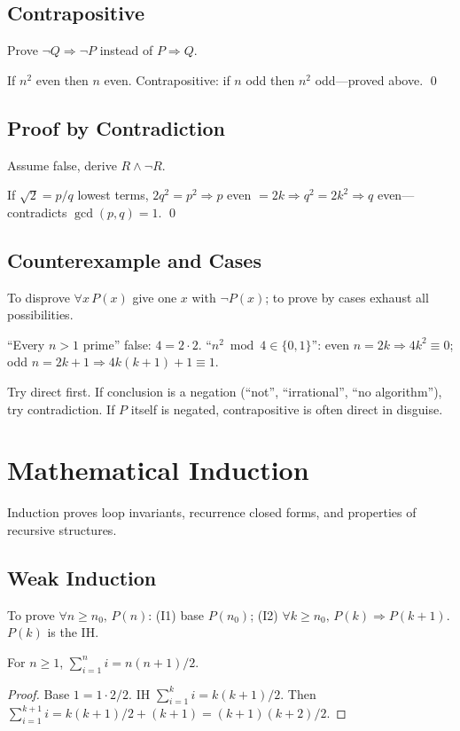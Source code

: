 \subsection{Contrapositive} Prove $\neg Q\Rightarrow\neg P$ instead of $P\Rightarrow Q$.
\begin{example} If $n^2$ even then $n$ even. Contrapositive: if $n$ odd then $n^2$ odd---proved above. \qed \end{example}
\subsection{Proof by Contradiction} Assume false, derive $R\land\neg R$.
\begin{example} If $\sqrt2=p/q$ lowest terms, $2q^2=p^2\Rightarrow p$ even $=2k\Rightarrow q^2=2k^2\Rightarrow q$ even---contradicts $\gcd(p,q)=1$. \qed \end{example}
\subsection{Counterexample and Cases} To disprove $\forall x\,P(x)$ give one $x$ with $\neg P(x)$; to prove by cases exhaust all possibilities.
\begin{example} ``Every $n>1$ prime'' false: $4=2\cdot2$. ``$n^2\bmod4\in\{0,1\}$'': even $n=2k\Rightarrow4k^2\equiv0$; odd $n=2k+1\Rightarrow4k(k+1)+1\equiv1$. \end{example}
\begin{remark} Try direct first. If conclusion is a negation (``not'', ``irrational'', ``no algorithm''), try contradiction. If $P$ itself is negated, contrapositive is often direct in disguise. \end{remark}

\section{Mathematical Induction}
\label{sec:induction}
Induction proves loop invariants, recurrence closed forms, and properties of recursive structures.
\subsection{Weak Induction} To prove $\forall n\ge n_0,\,P(n)$: (I1) base $P(n_0)$; (I2) $\forall k\ge n_0,\,P(k)\Rightarrow P(k+1)$. $P(k)$ is the IH.
\begin{theorem} For $n\ge1$, $\sum_{i=1}^{n}i=n(n+1)/2$. \end{theorem}
\begin{proof} Base $1=1\cdot2/2$. IH $\sum_{i=1}^{k}i=k(k+1)/2$. Then $\sum_{i=1}^{k+1}i=k(k+1)/2+(k+1)=(k+1)(k+2)/2$. \end{proof}

